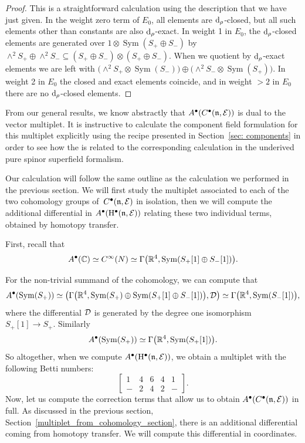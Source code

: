 \documentclass[pdftex]{sigma}
\numberwithin{equation}{section}
\def\cE{\mathcal E}\def\cF{\mathcal F}\def\cG{\mathcal G}\def\cH{\mathcal H}
\def\d{{\rm d}}
\DeclareMathOperator{\Sym}{Sym}
\begin{document}
\begin{proof}
	This is a straightforward calculation using the description that we have just given. In the weight zero term of $E_0$, all elements are $\d_\rho$-closed, but all such elements other than constants are also $\d_\rho$-exact. In weight 1 in $E_0$, the $\d_\rho$-closed elements are generated over $1 \otimes \Sym(S_+ \oplus S_-)$ by $\wedge^2 S_+ \oplus \wedge^2 S_- \subseteq (S_+ \oplus S_-) \otimes (S_+ \oplus S_-)$. When we quotient by $\d_\rho$-exact elements we are left with $\bigl(\wedge^2 S_+ \otimes \Sym(S_-)\bigr) \oplus \bigl(\wedge^2 S_- \otimes \Sym(S_+)\bigr)$. In weight 2 in $E_0$ the closed and exact elements coincide, and in weight $>2$ in $E_0$ there are no $\d_\rho$-closed elements.
\end{proof}

From our general results, we know abstractly that $A^\bullet(C^\bullet(\fn, \cE))$ is dual to the vector multiplet. It is instructive to calculate the component field formulation for this multiplet explicitly using the recipe presented in Section~\ref{sec: components} in order to see how the is related to the corresponding calculation in the underived pure spinor superfield formalism.

Our calculation will follow the same outline as the calculation we performed in the previous section. We will first study the multiplet associated to each of the two cohomology groups of~$C^\bullet(\mathfrak n, \mathcal E)$ in isolation, then we will compute the additional differential in $A^\bullet(\mathrm H^\bullet(\mathfrak n, \mathcal E))$ relating these two individual terms, obtained by homotopy transfer.

First, recall that
\begin{equation*}
A^\bullet(\CC) \simeq C^\infty(N)
\simeq \Gamma\big(\RR^4, \Sym(S_+[1] \oplus S_-[1])\big).
\end{equation*}

For the non-trivial summand of the cohomology, we can compute that
\begin{equation*}
A^\bullet(\Sym(S_+)) \simeq \big(\Gamma\big(\RR^4, \Sym(S_+) \oplus \Sym(S_+[1] \oplus S_-[1])\big), \cD\big)
\simeq \Gamma\big(\RR^4, \Sym(S_-[1])\big),
\end{equation*}
where the differential $\mathcal D$ is generated by the degree one isomorphism $S_+[1] \to S_+$. Similarly
\begin{equation*}
A^\bullet(\Sym(S_+)) \simeq \Gamma\big(\RR^4, \Sym(S_+[1])\big).
\end{equation*}
So altogether, when we compute $A^\bullet(\mathrm H^\bullet(\mathfrak n, \mathcal E))$, we obtain a multiplet with the following Betti numbers:
\begin{equation*}
\begin{bmatrix}
1 & 4 & 6 & 4 & 1 \\
- & 2 & 4 & 2 &-
\end{bmatrix} .
\end{equation*}
Now, let us compute the correction terms that allow us to obtain $A^\bullet(C^\bullet(\mathfrak n, \mathcal E))$ in full. As discussed in the previous section, Section~\ref{multiplet_from_cohomology_section}, there is an additional differential coming from homotopy transfer. We will compute this differential in coordinates.
\end{document}
